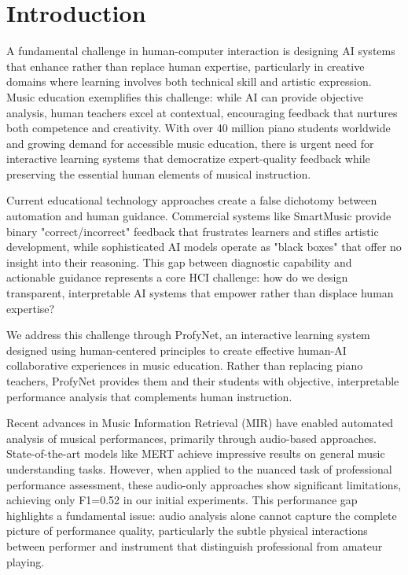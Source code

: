 \documentclass[sigconf,review,anonymous]{acmart}
\begin{document}
\section{Introduction}

A fundamental challenge in human-computer interaction is designing AI systems that enhance rather than replace human expertise, particularly in creative domains where learning involves both technical skill and artistic expression.
Music education exemplifies this challenge: while AI can provide objective analysis, human teachers excel at contextual, encouraging feedback that nurtures both competence and creativity.
With over 40 million piano students worldwide and growing demand for accessible music education, there is urgent need for interactive learning systems that democratize expert-quality feedback while preserving the essential human elements of musical instruction.

Current educational technology approaches create a false dichotomy between automation and human guidance. Commercial systems like SmartMusic provide binary "correct/incorrect" feedback that frustrates learners and stifles artistic development, while sophisticated AI models operate as "black boxes" that offer no insight into their reasoning.
This gap between diagnostic capability and actionable guidance represents a core HCI challenge: how do we design transparent, interpretable AI systems that empower rather than displace human expertise?

We address this challenge through ProfyNet, an interactive learning system designed using human-centered principles to create effective human-AI collaborative experiences in music education.
Rather than replacing piano teachers, ProfyNet provides them and their students with objective, interpretable performance analysis that complements human instruction.

Recent advances in Music Information Retrieval (MIR) have enabled automated analysis of musical performances, primarily through audio-based approaches.
State-of-the-art models like MERT achieve impressive results on general music understanding tasks.
However, when applied to the nuanced task of professional performance assessment, these audio-only approaches show significant limitations, achieving only F1=0.52 in our initial experiments.
This performance gap highlights a fundamental issue: audio analysis alone cannot capture the complete picture of performance quality, particularly the subtle physical interactions between performer and instrument that distinguish professional from amateur playing.
\end{document}
